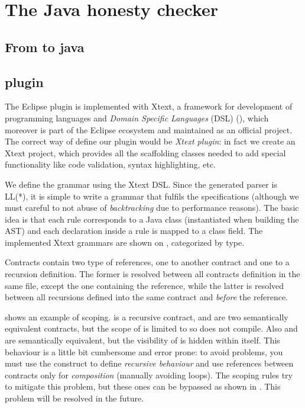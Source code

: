 
\section{The Java honesty checker}\label{sec:java-honesty}



\subsection{From \coco to java }


\subsection{\coco plugin }
The \coco Eclipse plugin is implemented with Xtext, a framework for development of programming languages and \textit{Domain Specific Languages} (DSL) (), which moreover is part of the Eclipse ecosystem and maintained as an official project. The correct way of define our plugin would be \textit{Xtext plugin}: in fact we create an Xtext project, which provides all the scaffolding classes needed to add special functionality like code validation, syntax highlighting, etc.


We define the \coco grammar using the Xtext DSL. Since the generated parser is LL(*), it is simple to write a grammar that fulfils the \coco specifications (although we must careful to not abuse of \textit{backtracking} due to performance reasons). The basic idea is that each rule corresponds to a Java class (instantiated when building the AST) and each declaration inside a rule is mapped to a class field. The implemented Xtext grammars are shown on , categorized by type.

Contracts contain two type of references, one to another contract and one to a recursion definition. The former is resolved between all contracts definition in the same file, except the one containing the reference, while the latter is resolved between all recursions defined into the same contract and \emph{before} the reference.

 shows an example of scoping.  is a recursive contract,  and  are two semantically equivalent contracts, but the scope of  is limited to  so  does not compile.
Also  and  are semantically equivalent, but the visibility of  is hidden within  itself.
%
This behaviour is a little bit cumbersome and error prone: to avoid problems, you must use the  construct to define \textit{recursive behaviour} and use references between contracts only for \textit{composition} (manually avoiding loops). The scoping rules try to mitigate this problem, but these ones can be bypassed as shown in . This problem will be resolved in the future.

